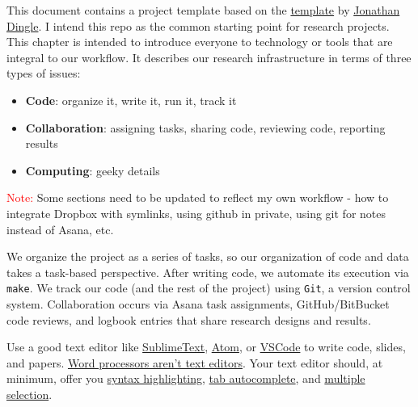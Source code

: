 This document contains a project template based on 
the \href{https://github.com/jrm87/projecttemplate}{template} by \href{http://www.jdingel.com/}{Jonathan Dingle}. 
I intend this repo as the common starting point for research projects. This chapter is intended to introduce everyone to technology or tools that are integral to our workflow.
It describes our research infrastructure in terms of three types of issues:
\begin{itemize}
\item \textbf{Code}: organize it, write it, run it, track it
\item \textbf{Collaboration}: assigning tasks, sharing code, reviewing code, reporting results
\item \textbf{Computing}: geeky details
\end{itemize}

\textcolor{red}{Note:} Some sections need to be updated to reflect my own workflow - 
how to integrate Dropbox with symlinks, using github in private, using git for notes instead of Asana, etc.

We organize the project as a series of tasks, so our organization of code and data takes a task-based perspective.
After writing code, we automate its execution via \texttt{make}.
We track our code (and the rest of the project) using \texttt{Git}, a version control system.
Collaboration occurs via Asana task assignments, GitHub/BitBucket code reviews, and logbook entries that share research designs and results.

Use a good text editor like
\href{https://www.sublimetext.com/}{SublimeText},
\href{https://atom.io/}{Atom},
or
\href{https://code.visualstudio.com/}{VSCode}
to write code, slides, and papers.
\href{http://plain-text.co/write-and-edit.html}{Word processors aren't text editors}.
Your text editor should, at minimum, offer you
\href{https://en.wikipedia.org/wiki/Syntax_highlighting}{syntax highlighting},
\href{https://en.wikipedia.org/wiki/Command-line_completion}{tab autocomplete},
and \href{https://www.sublimetext.com/}{multiple selection}.

